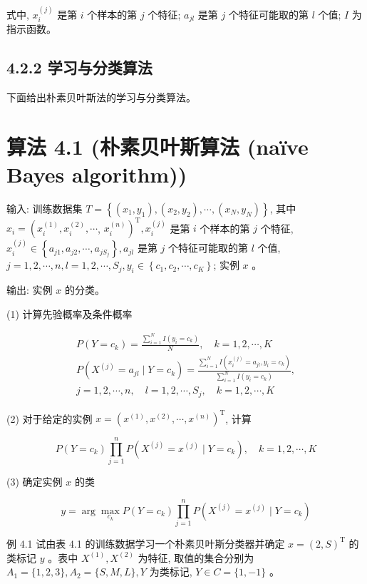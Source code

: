 \documentclass[10pt]{article}
\begin{document}
式中, $x_{i}^{(j)}$ 是第 $i$ 个样本的第 $j$ 个特征; $a_{j l}$ 是第 $j$ 个特征可能取的第 $l$ 个值; $I$ 为指示函数。

\subsection*{4.2.2 学习与分类算法}
下面给出朴素贝叶斯法的学习与分类算法。

\section*{算法 4.1 (朴素贝叶斯算法 (naïve Bayes algorithm))}
输入: 训练数据集 $T=\left\{\left(x_{1}, y_{1}\right),\left(x_{2}, y_{2}\right), \cdots,\left(x_{N}, y_{N}\right)\right\}$, 其中 $x_{i}=\left(x_{i}^{(1)}, x_{i}^{(2)}, \cdots\right.$, $\left.x_{i}^{(n)}\right)^{\mathrm{T}}, x_{i}^{(j)}$ 是第 $i$ 个样本的第 $j$ 个特征, $x_{i}^{(j)} \in\left\{a_{j 1}, a_{j 2}, \cdots, a_{j S_{j}}\right\}, a_{j l}$ 是第 $j$ 个特征可能取的第 $l$ 个值, $j=1,2, \cdots, n, l=1,2, \cdots, S_{j}, y_{i} \in\left\{c_{1}, c_{2}, \cdots, c_{K}\right\}$; 实例 $x$ 。

输出: 实例 $x$ 的分类。

(1) 计算先验概率及条件概率

$$
\begin{gathered}
P\left(Y=c_{k}\right)=\frac{\sum_{i=1}^{N} I\left(y_{i}=c_{k}\right)}{N}, \quad k=1,2, \cdots, K \\
P\left(X^{(j)}=a_{j l} \mid Y=c_{k}\right)=\frac{\sum_{i=1}^{N} I\left(x_{i}^{(j)}=a_{j l}, y_{i}=c_{k}\right)}{\sum_{i=1}^{N} I\left(y_{i}=c_{k}\right)}, \\
j=1,2, \cdots, n, \quad l=1,2, \cdots, S_{j}, \quad k=1,2, \cdots, K
\end{gathered}
$$

(2) 对于给定的实例 $x=\left(x^{(1)}, x^{(2)}, \cdots, x^{(n)}\right)^{\mathrm{T}}$, 计算

$$
P\left(Y=c_{k}\right) \prod_{j=1}^{n} P\left(X^{(j)}=x^{(j)} \mid Y=c_{k}\right), \quad k=1,2, \cdots, K
$$

(3) 确定实例 $x$ 的类

$$
y=\arg \max _{c_{k}} P\left(Y=c_{k}\right) \prod_{j=1}^{n} P\left(X^{(j)}=x^{(j)} \mid Y=c_{k}\right)
$$

例 4.1 试由表 4.1 的训练数据学习一个朴素贝叶斯分类器并确定 $x=(2, S)^{\mathrm{T}}$ 的类标记 $y$ 。表中 $X^{(1)}, X^{(2)}$ 为特征, 取值的集合分别为 $A_{1}=\{1,2,3\}, A_{2}=\{S, M, L\}, Y$ 为类标记, $Y \in C=\{1,-1\}$ 。
\end{document}
